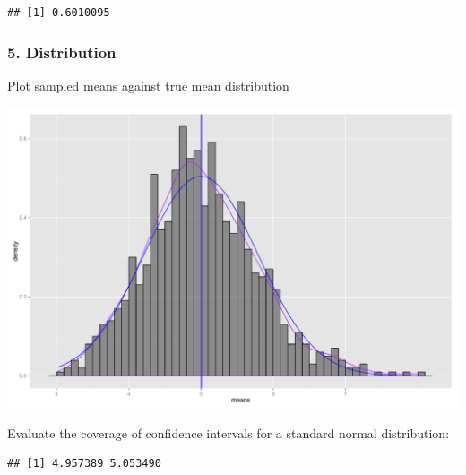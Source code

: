 \documentclass[]{article}
\newenvironment{Shaded}{\begin{snugshade}}{\end{snugshade}}
\newcommand{\KeywordTok}[1]{\textcolor[rgb]{0.13,0.29,0.53}{\textbf{{#1}}}}
\newcommand{\DecValTok}[1]{\textcolor[rgb]{0.00,0.00,0.81}{{#1}}}
\newcommand{\FloatTok}[1]{\textcolor[rgb]{0.00,0.00,0.81}{{#1}}}
\newcommand{\StringTok}[1]{\textcolor[rgb]{0.31,0.60,0.02}{{#1}}}
\newcommand{\NormalTok}[1]{{#1}}
\begin{document}
\begin{Shaded}
\end{Shaded}

\begin{verbatim}
## [1] 0.6010095
\end{verbatim}

\subsubsection{5. Distribution}\label{distribution}

Plot sampled means against true mean distribution

\includegraphics{figure/unnamed-chunk-9-1.pdf}

Evaluate the coverage of confidence intervals for a standard normal
distribution:

\begin{Shaded}
\end{Shaded}

\begin{verbatim}
## [1] 4.957389 5.053490
\end{verbatim}
\end{document}
